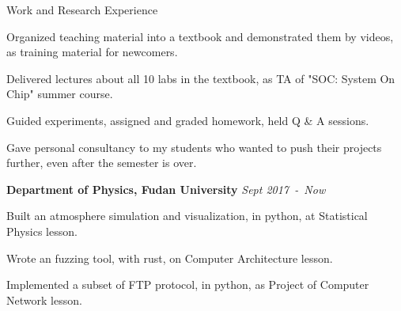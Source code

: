 \documentclass{resume} %
\begin{document}
\begin{rSection}{Work and Research Experience}
\begin{rSubsection}
\item Organized teaching material into a textbook and demonstrated them by videos, as training material for newcomers.
\begin{mySecondItemize}
    \item Delivered lectures about all 10 labs in the textbook, as TA of "SOC: System On Chip" summer course.
    \item Guided experiments, assigned and graded homework, held Q \& A sessions.
    \item Gave personal consultancy to my students who wanted to push their projects further, even after the semester is over.
\end{mySecondItemize}
 
\end{rSubsection}

{\bf Department of Physics, Fudan University } \hfill {\em Sept 2017\ -\ Now}
\begin{myItemize}
\item Built an atmosphere simulation and visualization, in python, at Statistical Physics lesson.
\item Wrote an fuzzing tool, with rust,  on Computer Architecture lesson.
\item Implemented a subset of FTP protocol, in python, as Project of Computer Network lesson.
\end{myItemize}

\end{rSection}

\end{document}
